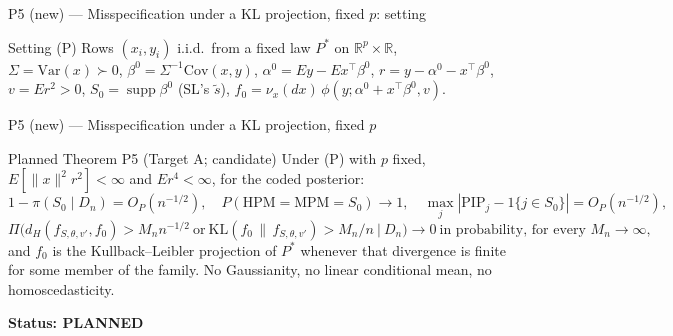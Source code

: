 \begin{frame}{P5 (new) --- Misspecification under a KL projection, fixed $p$: setting}
\begin{alertblock}{Setting (P)}
Rows $(x_i,y_i)$ i.i.d.\ from a fixed law $P^*$ on $\mathbb R^p\times\mathbb R$, $\Sigma=\mathrm{Var}(x)\succ0$,
$\beta^0=\Sigma^{-1}\mathrm{Cov}(x,y)$, $\alpha^0=Ey-Ex^\top\beta^0$, $r=y-\alpha^0-x^\top\beta^0$, $v=Er^2>0$,
$S_0=\operatorname{supp}\beta^0$ (SL's $\tilde s$), $f_0=\nu_x(dx)\,\phi(y;\alpha^0+x^\top\beta^0,v)$.
\end{alertblock}
\end{frame}

\begin{frame}{P5 (new) --- Misspecification under a KL projection, fixed $p$}
\small
\begin{alertblock}{Planned Theorem P5 (Target A; candidate)}
Under (P) with $p$ fixed, $E[\|x\|^2r^2]<\infty$ and $Er^4<\infty$, for the coded posterior:
\[
1-\pi(S_0\mid D_n)=O_P(n^{-1/2}),\quad P(\mathrm{HPM}=\mathrm{MPM}=S_0)\to1,\quad
\max_j|\mathrm{PIP}_j-1\{j\in S_0\}|=O_P(n^{-1/2}),
\]
\[
\Pi\big(d_H(f_{S,\theta,v'},f_0)>M_nn^{-1/2}\ \text{or}\ \mathrm{KL}(f_0\,\|\,f_{S,\theta,v'})>M_n/n\ \big|\ D_n\big)\to0
\ \text{in probability, for every }M_n\to\infty,
\]
and $f_0$ is the Kullback--Leibler projection of $P^*$ whenever that divergence is finite for some member of the family.
No Gaussianity, no linear conditional mean, no homoscedasticity.
\end{alertblock}
\textbf{Status: PLANNED} 
\end{frame}

